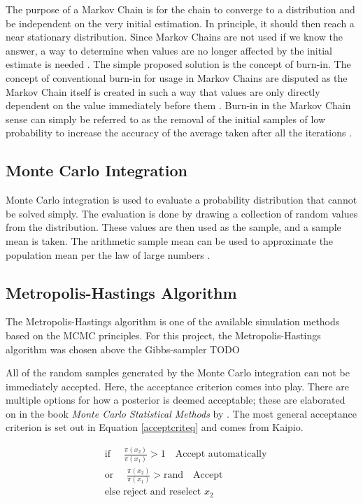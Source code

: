 	The purpose of a Markov Chain is for the chain to converge to a distribution and be independent on the very initial estimation. 
	In principle, it should then reach a near stationary distribution.
	Since Markov Chains are not used if we know the answer, a way to determine when values are no longer affected by the initial estimate is needed \cite{Gilks:1996}. 
	The simple proposed solution is the concept of burn-in. 
	The concept of conventional burn-in for usage in Markov Chains are disputed as the Markov Chain itself is created in such a way that values are only directly dependent on the value immediately before them \cite{Meyn:1993}.
	Burn-in in the Markov Chain sense can simply be referred to as the removal of the initial samples of low probability to increase the accuracy of the average taken after all the iterations \cite{John:2016}.
		
	\subsection{Monte Carlo Integration}\label{MCint_sec}
	Monte Carlo integration is used to evaluate a probability distribution that cannot be solved simply. 
	The evaluation is done by drawing a collection of random values from the distribution.
	These values are then used as the sample, and a sample mean is taken.
	The arithmetic sample mean can be used to approximate the population mean per the law of large numbers \citep{Gilks:1996}.
	
	

\subsection{Metropolis-Hastings Algorithm}

The Metropolis-Hastings algorithm is one of the available simulation methods based on the MCMC principles. 
For this project, the Metropolis-Hastings algorithm was chosen above the Gibbs-sampler TODO

All of the random samples generated by the Monte Carlo integration can not be immediately accepted.
	Here, the acceptance criterion comes into play.
	There are multiple options for how a posterior is deemed acceptable; these are elaborated on in the book  \textit{Monte Carlo Statistical Methods} by \citeauthor{Robert:2004}. 
	The most general acceptance criterion is set out in Equation \ref{acceptcriteq} and comes from Kaipio.
	
		\begin{equation} \label{acceptcriteq}
		\begin{aligned}
		&\text{if  }\quad \frac{\pi (x_2)}{\pi(x_1)} > 1 \quad \text{Accept automatically}\\
		&\text{or  }\quad \frac{\pi (x_2)}{\pi(x_1)} > \text{rand}  \quad \text{Accept}\\
		&\text{else reject and reselect  } x_2
		\end{aligned}
		\end{equation}

